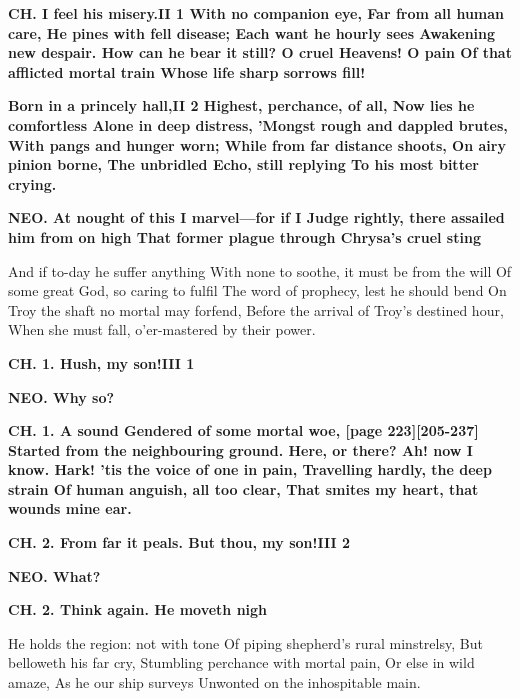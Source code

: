 \documentclass[11pt,letter]{book}
\begin{document}
\par \textbf{CH. I feel his misery.II 1 With no companion eye, Far from all human care, He pines with fell disease; Each want he hourly sees Awakening new despair. How can he bear it still? O cruel Heavens! O pain Of that afflicted mortal train Whose life sharp sorrows fill!}
\par 

\par \textbf{Born in a princely hall,II 2 Highest, perchance, of all, Now lies he comfortless Alone in deep distress, ’Mongst rough and dappled brutes, With pangs and hunger worn; While from far distance shoots, On airy pinion borne, The unbridled Echo, still replying To his most bitter crying.}
\par 

\par \textbf{NEO. At nought of this I marvel—for if I Judge rightly, there assailed him from on high That former plague through Chrysa’s cruel sting}
\par   And if to-day he suffer anything With none to soothe, it must be from the will Of some great God, so caring to fulfil The word of prophecy, lest he should bend On Troy the shaft no mortal may forfend, Before the arrival of Troy’s destined hour, When she must fall, o’er-mastered by their power.

\par \textbf{CH. 1. Hush, my son!III 1}
\par 

\par \textbf{NEO. Why so?}
\par 

\par \textbf{CH. 1. A sound Gendered of some mortal woe, [page 223][205-237] Started from the neighbouring ground. Here, or there? Ah! now I know. Hark! ’tis the voice of one in pain, Travelling hardly, the deep strain Of human anguish, all too clear, That smites my heart, that wounds mine ear.}
\par 

\par \textbf{CH. 2. From far it peals. But thou, my son!III 2}
\par 

\par \textbf{NEO. What?}
\par 

\par \textbf{CH. 2. Think again. He moveth nigh}
\par   He holds the region:  not with tone Of piping shepherd’s rural minstrelsy, But belloweth his far cry, Stumbling perchance with mortal pain, Or else in wild amaze, As he our ship surveys Unwonted on the inhospitable main.
\end{document}
